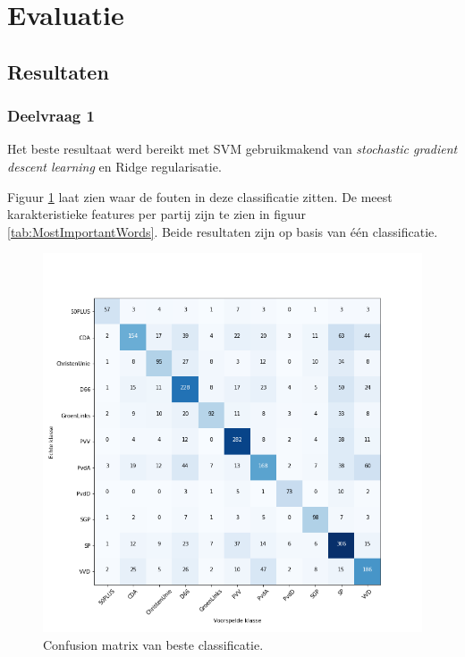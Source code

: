 \section{Evaluatie}
\label{sec:eva}

\subsection{Resultaten}

\subsubsection{Deelvraag 1}
Het beste resultaat werd bereikt met SVM gebruikmakend van \textit{stochastic gradient descent learning} en Ridge regularisatie.\par

Figuur \ref{fig:confusionmatrix} laat zien waar de fouten in deze classificatie zitten. De meest karakteristieke features per partij zijn te zien in figuur \ref{tab:MostImportantWords}. Beide resultaten zijn op basis van één classificatie.


\begin{figure}[H]
  \centering
    \includegraphics[width=0.6\paperwidth]{Verslag/Tables/confusionmatrix.png}
\caption{Confusion matrix van beste classificatie.}
\label{fig:confusionmatrix}
\end{figure}

